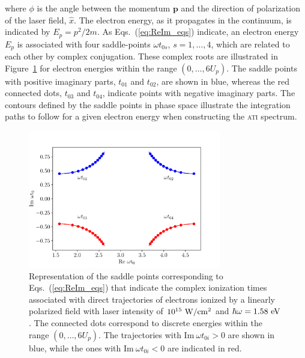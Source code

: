 %
where $\phi$ is the angle between the momentum $\mathbf{p}$ and the
direction of polarization of the laser field, $\hat{x}$. The electron
energy, as it propagates in the continuum, is indicated by $E_{p} =
p^{2}/2m$. As Eqs.~(\ref{eq:ReIm_eqs}) indicate, an electron energy
$E_{p}$ is associated with four saddle-points $\omega t_{0s}$, $s = 1,
\dots, 4$, which are related to each other by complex conjugation.
These complex roots are illustrated in Figure~\ref{fig:sp_direct} for
electron energies within the range $(0, \dots, 6U_{p})$. The saddle
points with positive imaginary parts, $t_{01}$ and $t_{02}$, are shown
in blue, whereas the red connected dots, $t_{03}$ and $t_{04}$,
indicate points with negative imaginary parts. The contours defined by
the saddle points in phase space illustrate the integration paths to
follow for a given electron energy when constructing the \textsc{ati}
spectrum.

\begin{figure}
  \centering
  \includegraphics[width = 0.75\textwidth]{figures/ch_ATI_SPA/direct/spDirectElectrons}
  \caption{Representation of the saddle points corresponding to
    Eqs.~(\ref{eq:ReIm_eqs}) that indicate the complex ionization
    times associated with direct trajectories of electrons ionized by
    a linearly polarized field with laser intensity of
    $10^{15}\ \rm{W/cm^{2}}$ and $\hbar\omega = 1.58\ \rm{eV}$. The
    connected dots correspond to discrete energies within the range
    $(0, \dots, 6 U_{p})$. The trajectories with $\mathrm{Im}\ \omega
    t_{0i} > 0$ are shown in blue, while the ones with
    $\mathrm{Im}\ \omega t_{0i} < 0$ are indicated in red.}
  \label{fig:sp_direct}
\end{figure}


